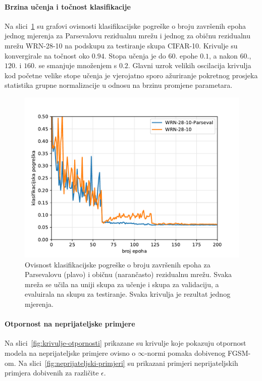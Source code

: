 \documentclass[utf8, seminar, numeric, lmodern]{feri}
\begin{document}
\paragraph{Brzina učenja i točnost klasifikacije} Na slici~\ref{fig:krivulje-pogreske-moje} su grafovi ovisnosti klasifikacijske pogreške o broju završenih epoha jednog mjerenja za Parsevalovu rezidualnu mrežu i jednog za običnu rezidualnu mrežu WRN-28-10 na podskupu za testiranje skupa CIFAR-10. Krivulje su konvergirale na točnost oko $0.94$. Stopa učenja je do $60.$ epohe $0.1$, a nakon $60.$, $120.$ i $160.$ se smanjuje množenjem s $0.2$. Glavni uzrok velikih oscilacija krivulja kod početne velike stope učenja je vjerojatno sporo ažuriranje pokretnog prosjeka statistika grupne normalizacije u odnosu na brzinu promjene parametara. 

\begin{figure}[htbp]
	\centering
	\includegraphics[width=1\linewidth]{ilustracije/grafovi/krivulje-pogreske}
	\caption{
		Ovisnost klasifikacijske pogreške o broju završenih epoha za Parsevalovu (plavo) i običnu (narančasto) rezidualnu mrežu. Svaka mreža se učila na uniji skupa za učenje i skupa za validaciju, a evaluirala na skupu za testiranje. Svaka krivulja je rezultat jednog mjerenja.
	}
	\label{fig:krivulje-pogreske-moje}
\end{figure}

\paragraph{Otpornost na neprijateljske primjere} Na slici~\ref{fig:krivulje-otpornosti} prikazane su krivulje koje pokazuju otpornost modela na neprijateljske primjere ovisno o $\infty$-normi pomaka dobivenog FGSM-om. Na slici~\ref{fig:neprijateljski-primjeri} su prikazani primjeri neprijateljskih primjera dobivenih za različite $\epsilon$.
\end{document}
